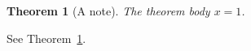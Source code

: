 \documentclass{article}
\theoremstyle{custom}\newtheorem{theorem}{Theorem}
\begin{document}
\begin{theorem}[A note]\label{thm:one}The theorem body $x=1$.\end{theorem}
See Theorem~\ref{thm:one}.
\end{document}
